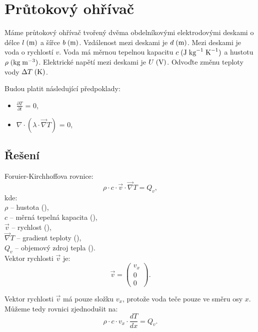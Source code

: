 \documentclass{article}
\begin{document}
\maketitle
\tableofcontents
\newpage



\section{Průtokový ohřívač \spicy \spicy \spicy \spicy}
Máme průtokový ohřívač tvořený dvěma obdelníkovými elektrodovými deskami o délce $l \; (\textrm{m})$ a šířce $b \; (\textrm{m})$. Vzdálenost mezi deskami je $d \; (\textrm{m})$. Mezi deskami je voda o rychlostí $v$. Voda má měrnou tepelnou kapacitu $c \; (\textrm{J} \; \textrm{kg}^{-1} \; \textrm{K}^{-1})$ a hustotu $\rho \; (\textrm{kg} \; \textrm{m}^{-3})$. Elektrické napětí mezi deskami je $U \; (\textrm{V})$. Odvoďte změnu teploty vody $\Delta T \; (\textrm{K})$.

Budou platit následující předpoklady:
\begin{itemize}
    \item $\frac{\partial T}{\partial t}$ = 0,
    \item $\nabla \cdot (\lambda \cdot \vec{\nabla} T)$ = 0,
\end{itemize}


\subsection{Řešení}
Foruier-Kirchhoffova rovnice:
\begin{equation}
    \rho \cdot c \cdot \vec{v} \cdot \vec{\nabla} T = Q_v,
\end{equation}
kde:\\
$\rho$ -- hustota (\ueqKGandMinvcu),\\
$c$ -- měrná tepelná kapacita (\ueqJandKGinvKinv),\\
$\vec{v}$ -- rychlost (\ueqMandSinv),\\
$\vec{\nabla} T$ -- gradient teploty (\ueqKandMinv),\\
$Q_v$ -- objemový zdroj tepla (\ueqWandMinvcu).\\

Vektor rychlosti $\vec{v}$ je:
$$
    \vec{v} = \begin{pmatrix} v_x \\ 0 \\ 0 \end{pmatrix}.
$$

Vektor rychlosti $\vec{v}$ má pouze složku $v_x$, protože voda teče pouze ve směru osy $x$. Můžeme tedy rovnici zjednodušit na:
$$
    \rho \cdot c \cdot v_x \cdot \frac{dT}{dx} = Q_v.
$$
\end{document}
